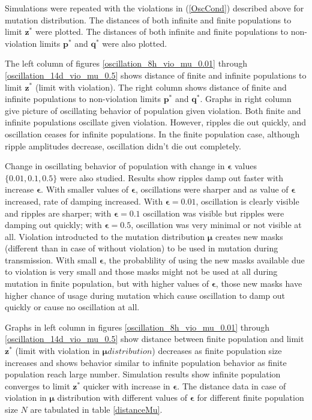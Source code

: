 Simulations were repeated with the violations in (\ref{OscCond}) described above for mutation distribution.
The distances of both infinite and finite populations to limit $\bm{z}^\ast$ were plotted. 
The distances of both infinite and finite populations to non-violation limits $\bm{p}^\ast$ and $\bm{q}^\ast$ were also plotted.



The left column of figures \ref{oscillation_8h_vio_mu_0.01} through \ref{oscillation_14d_vio_mu_0.5} 
shows distance of finite and infinite populations to limit $\bm{z^\ast}$ (limit with violation). The 
right column shows distance of finite and infinite populations to non-violation limits $\bm{p^\ast}$ and $\bm{q^\ast}$. 
Graphs in right column give picture of oscillating behavior of population given violation. 
Both finite and infinite populations oscillate given violation. However, ripples die out quickly, 
and oscillation ceases for infinite populations.
In the finite population case, although ripple amplitudes decrease, oscillation didn't die out completely. 

Change in oscillating behavior of population with change in $\bm{\epsilon}$ values $\{0.01, 0.1, 0.5\}$ were also studied. 
Results show ripples damp out faster with increase $\bm{\epsilon}$.
With smaller values of $\bm{\epsilon}$, oscillations were sharper and as value of $\bm{\epsilon}$ increased, 
rate of damping increased. With $\bm{\epsilon} = 0.01$, oscillation is clearly visible and ripples are sharper; with $\bm{\epsilon} = 0.1$ oscillation was visible 
but ripples were damping out quickly;  with $\bm{\epsilon} = 0.5$, oscillation was very minimal or not visible at all. 
Violation introducted to the mutation distribution $\bm{\mu}$ creates new masks (different than in case of without violation) to be used in mutation 
during transmission. With small $\bm{\epsilon}$, the probablility of using the new masks available due to violation is very small and 
those masks might not be used at all during mutation in finite population, but with higher values of $\bm{\epsilon}$, 
those new masks have higher chance of usage during mutation which cause oscillation to damp out quickly or cause no oscillation at all.

Graphs in left column in figures \ref{oscillation_8h_vio_mu_0.01} through \ref{oscillation_14d_vio_mu_0.5} show distance 
between finite population and limit $\bm{z}^\ast$ (limit with violation in $\bm{\mu} distribution$) decreases as finite population size increases 
and shows behavior similar to infinite population behavior as finite population reach large number. Simulation results show infinite population converges 
to limit $\bm{z^\ast}$ quicker with increase in $\bm{\epsilon}$. The distance data in case of violation in $\bm{\mu}$ distribution 
with different values of $\bm{\epsilon}$ for different finite population size $N$ are tabulated in table \ref{distanceMu}.

